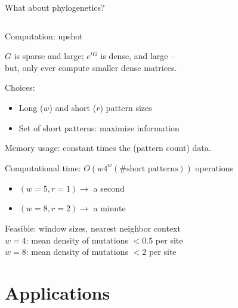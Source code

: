 \documentclass[smaller]{beamer}
\begin{document}
\begin{frame}{What about phylogenetics?}
\begin{columns}[c]
\begin{column}{.5\textwidth}
    \end{column}
  \end{columns}

\end{frame}

\begin{frame}{Computation: upshot}

  $G$ is sparse and large; $e^{tG}$ is dense, and large -- \\
  \hspace{3em} but, only ever compute smaller dense matrices.

  \vspace{1em}

  {\struct Choices:}
  \begin{itemize}
    \item Long ($w$) and short ($r$) pattern sizes
    \item Set of short patterns: maximize information
  \end{itemize}

  \vspace{1em}

  {\struct Memory usage:} constant times the (pattern count) data.

  \vspace{1em}

  {\struct Computational time:} $O(w 4^{w} (\#\text{short patterns}))$ operations 
  \begin{itemize}
    \item $(w=5,r=1) \longrightarrow$  a second
    \item $(w=8,r=2) \longrightarrow$  a minute
  \end{itemize}

  \vspace{1em}

  {\struct Feasible:} window sizes, nearest neighbor context \\
  \hspace{3em} $w=4$: mean density of mutations ${} < 0.5$ per site\\
  \hspace{3em}   $w=8$: mean density of mutations ${} < 2$ per site

\end{frame}


\section{Applications}
\end{document}
